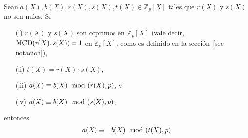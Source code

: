 	\begin{lemma}\label{lema-a}
		Sean $a(X),b(X),r(X),s(X),t(X)\in \mathbb{Z}_p[X]$ tales que $r(X)$ y $s(X)$ no son nulos. Si
		\begin{itemize}
			\item[(i)] $r(X)$ y $s(X)$ son coprimos en $\mathbb{Z}_p[X]$ $($vale decir, ${\rm MCD}(r(X),s(X)) = 1$ en $\mathbb{Z}_p[X]$, como es definido en la sección~\ref{sec-notacion}$)$,
			
			\item[(ii)] $t(X)= r(X)\cdot s(X)$,
			\item[(iii)] $a(X)\equiv b(X)\mod (r(X),p)$, y
			\item[(iv)] $a(X)\equiv b(X)\mod (s(X),p)$,
		\end{itemize}
		entonces
		\begin{eqnarray}
			a(X)&\equiv &b(X)\mod (t(X),p) \nonumber 
		\end{eqnarray}
	\end{lemma}
